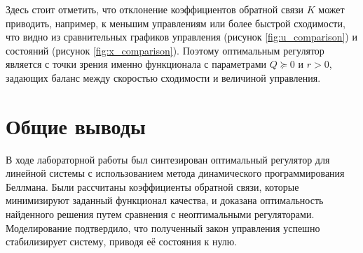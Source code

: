 \documentclass[a4paper,hidelinks,14pt]{extarticle}
\begin{document}
	Здесь стоит отметить, что отклонение коэффициентов обратной связи $K$ может приводить, например, к меньшим управлениям или более быстрой сходимости, что видно из сравнительных графиков управления (рисунок \ref{fig:u_comparison}) и состояний (рисунок \ref{fig:x_comparison}). Поэтому оптимальным регулятор является с точки зрения именно функционала с параметрами $Q \succcurlyeq 0$ и $r > 0$, задающих баланс между скоростью сходимости и величиной управления.

	\section{Общие выводы}
	В ходе лабораторной работы был синтезирован оптимальный регулятор для линейной системы с использованием метода динамического программирования Беллмана. Были рассчитаны коэффициенты обратной связи, которые минимизируют заданный функционал качества, и доказана оптимальность найденного решения путем сравнения с неоптимальными регуляторами. Моделирование подтвердило, что полученный закон управления успешно стабилизирует систему, приводя её состояния к нулю.
		

	


	
\end{document}
